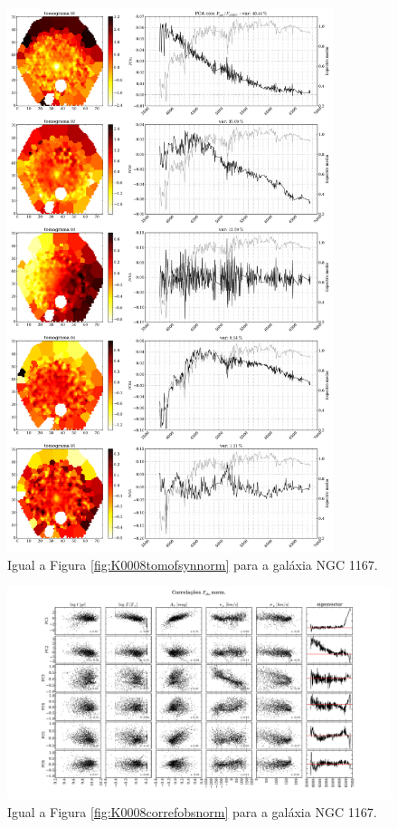 \begin{figure}
    \includegraphics[width=0.85\textwidth]{figuras/K0119-tomo-syn-norm.pdf}
    \caption[Tomogramas de 1 a 5 para o cubo $F_{syn}$ norm. - NGC 1167.]
    {Igual a Figura \ref{fig:K0008tomofsynnorm} para a galáxia NGC 1167.}
    \label{fig:K0119tomofsynnorm}
\end{figure}

\begin{figure}
    \includegraphics[width=1.3\textwidth, angle=-90]{figuras/K0119-correl-f_obs_norm-PCvsPhys.pdf}
	\caption[Correlações PCs vs. par\^ametros f\'isicos - $F_{obs}$ norm. - NGC 1167.]
	{Igual a Figura \ref{fig:K0008correfobsnorm} para a galáxia NGC 1167.}
    \label{fig:K0119correfobsnorm}
\end{figure}

